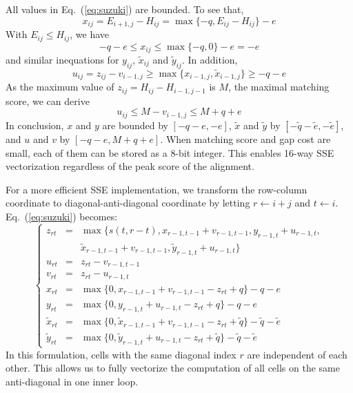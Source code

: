 \documentclass{bioinfo}
\begin{document}
\begin{methods}
All values in Eq.~(\ref{eq:suzuki}) are bounded. To see that,
\[
x_{ij}=E_{i+1,j}-H_{ij}=\max\{-q,E_{ij}-H_{ij}\}-e
\]
With $E_{ij}\le H_{ij}$, we have
\[
-q-e\le x_{ij}\le\max\{-q,0\}-e=-e
\]
and similar inequations for $y_{ij}$, $\tilde{x}_{ij}$ and $\tilde{y}_{ij}$.
In addition,
\[
u_{ij}=z_{ij}-v_{i-1,j}\ge\max\{x_{i-1,j},\tilde{x}_{i-1,j}\}\ge-q-e
\]
As the maximum value of $z_{ij}=H_{ij}-H_{i-1,j-1}$ is $M$, the maximal
matching score, we can derive
\[
u_{ij}\le M-v_{i-1,j}\le M+q+e
\]
In conclusion, $x$ and $y$ are bounded by $[-q-e,-e]$, $\tilde{x}$ and $\tilde{y}$ by
$[-\tilde{q}-\tilde{e},-\tilde{e}]$, and $u$ and $v$ by $[-q-e,M+q+e]$. When
matching score and gap cost are small, each of them can be stored as a 8-bit
integer. This enables 16-way SSE vectorization regardless of the peak score of
the alignment.

For a more efficient SSE implementation, we transform the row-column coordinate
to diagonal-anti-diagonal coordinate by letting $r\gets i+j$ and $t\gets i$.
Eq.~(\ref{eq:suzuki}) becomes:
\begin{equation*}
\left\{\begin{array}{lll}
z_{rt}&=&\max\{s(t,r-t),x_{r-1,t-1}+v_{r-1,t-1},y_{r-1,t}+u_{r-1,t},\\
&&\tilde{x}_{r-1,t-1}+v_{r-1,t-1},\tilde{y}_{r-1,t}+u_{r-1,t}\}\\
u_{rt}&=&z_{rt}-v_{r-1,t-1}\\
v_{rt}&=&z_{rt}-u_{r-1,t}\\
x_{rt}&=&\max\{0,x_{r-1,t-1}+v_{r-1,t-1}-z_{rt}+q\}-q-e\\
y_{rt}&=&\max\{0,y_{r-1,t}+u_{r-1,t}-z_{rt}+q\}-q-e\\
\tilde{x}_{rt}&=&\max\{0,\tilde{x}_{r-1,t-1}+v_{r-1,t-1}-z_{rt}+\tilde{q}\}-\tilde{q}-\tilde{e}\\
\tilde{y}_{rt}&=&\max\{0,\tilde{y}_{r-1,t}+u_{r-1,t}-z_{rt}+\tilde{q}\}-\tilde{q}-\tilde{e}
\end{array}\right.
\end{equation*}
In this formulation, cells with the same diagonal index $r$ are independent of
each other. This allows us to fully vectorize the computation of all cells on
the same anti-diagonal in one inner loop.


\end{methods}
\end{document}
